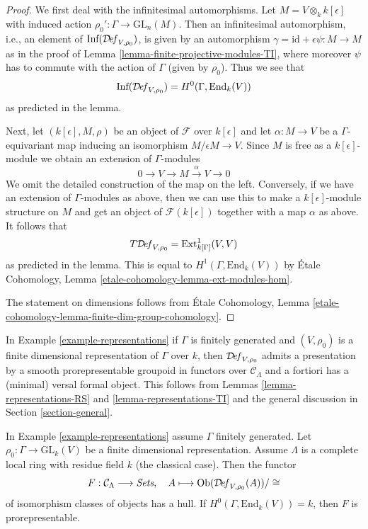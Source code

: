 \begin{proof}
We first deal with the infinitesimal automorphisms.
Let $M = V \otimes_k k[\epsilon]$ with induced action
$\rho_0' : \Gamma \to \text{GL}_n(M)$.
Then an infinitesimal automorphism, i.e., an element of
$\text{Inf}(\mathcal{D}\!\mathit{ef}_{V, \rho_0})$,
is given by an automorphism
$\gamma = \text{id} + \epsilon \psi : M \to M$
as in the proof of Lemma \ref{lemma-finite-projective-modules-TI},
where moreover $\psi$ has to commute
with the action of $\Gamma$ (given by $\rho_0$).
Thus we see that
$$
\text{Inf}(\mathcal{D}\!\mathit{ef}_{V, \rho_0}) = H^0(\Gamma, \text{End}_k(V))
$$
as predicted in the lemma.

\medskip\noindent
Next, let $(k[\epsilon], M, \rho)$ be an object of $\mathcal{F}$
over $k[\epsilon]$ and let $\alpha : M \to V$ be a $\Gamma$-equivariant map
inducing an isomorphism $M/\epsilon M \to V$.
Since $M$ is free as a $k[\epsilon]$-module we obtain
an extension of $\Gamma$-modules
$$
0 \to V \to M \xrightarrow{\alpha} V \to 0
$$
We omit the detailed construction of the map on the left.
Conversely, if we have an extension of $\Gamma$-modules as
above, then we can use this to make a $k[\epsilon]$-module
structure on $M$ and get an object of $\mathcal{F}(k[\epsilon])$
together with a map $\alpha$ as above.
It follows that
$$
T\mathcal{D}\!\mathit{ef}_{V, \rho_0} = \mathop{\mathrm{Ext}}\nolimits^1_{k[\Gamma]}(V, V)
$$
as predicted in the lemma. This is equal to
$H^1(\Gamma, \text{End}_k(V))$ by
\'Etale Cohomology, Lemma \ref{etale-cohomology-lemma-ext-modules-hom}.

\medskip\noindent
The statement on dimensions follows from
\'Etale Cohomology, Lemma
\ref{etale-cohomology-lemma-finite-dim-group-cohomology}.
\end{proof}

\noindent
In Example \ref{example-representations} if $\Gamma$ is finitely generated
and $(V, \rho_0)$ is a finite dimensional representation of $\Gamma$
over $k$, then $\mathcal{D}\!\mathit{ef}_{V, \rho_0}$
admits a presentation by a smooth prorepresentable groupoid in functors
over $\mathcal{C}_\Lambda$
and a fortiori has a (minimal) versal formal object. This follows
from Lemmas \ref{lemma-representations-RS} and \ref{lemma-representations-TI}
and the general discussion in Section \ref{section-general}.

\begin{lemma}
\label{lemma-representations-hull}
In Example \ref{example-representations} assume $\Gamma$ finitely generated.
Let $\rho_0 : \Gamma \to \text{GL}_k(V)$ be a finite dimensional representation.
Assume $\Lambda$ is a complete local ring with residue field $k$
(the classical case). Then the functor
$$
F : \mathcal{C}_\Lambda \longrightarrow \textit{Sets},\quad
A \longmapsto \mathop{\mathrm{Ob}}\nolimits(\mathcal{D}\!\mathit{ef}_{V, \rho_0}(A))/\cong
$$
of isomorphism classes of objects has a hull. If
$H^0(\Gamma, \text{End}_k(V)) = k$, then $F$ is
prorepresentable.
\end{lemma}

